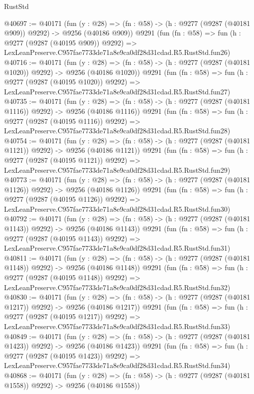 \begin{lexlean}{RustStd}
\begin{coremodule}
@40697 := @40171
    (fun (y : @28) => (fn : @58) -> (h : @9277 (@9287 (@40181 @909)) @9292) -> @9256 (@40186 @909))
    @9291
    (fun (fn : @58) =>
    fun (h : @9277 (@9287 (@40195 @909)) @9292) =>
    LexLeanPreserve.C957fae7733de71a8e9ca0df28d31cdad.R5.RustStd.fun26)
@40716 := @40171
    (fun (y : @28) =>
    (fn : @58) -> (h : @9277 (@9287 (@40181 @1020)) @9292) -> @9256 (@40186 @1020))
    @9291
    (fun (fn : @58) =>
    fun (h : @9277 (@9287 (@40195 @1020)) @9292) =>
    LexLeanPreserve.C957fae7733de71a8e9ca0df28d31cdad.R5.RustStd.fun27)
@40735 := @40171
    (fun (y : @28) =>
    (fn : @58) -> (h : @9277 (@9287 (@40181 @1116)) @9292) -> @9256 (@40186 @1116))
    @9291
    (fun (fn : @58) =>
    fun (h : @9277 (@9287 (@40195 @1116)) @9292) =>
    LexLeanPreserve.C957fae7733de71a8e9ca0df28d31cdad.R5.RustStd.fun28)
@40754 := @40171
    (fun (y : @28) =>
    (fn : @58) -> (h : @9277 (@9287 (@40181 @1121)) @9292) -> @9256 (@40186 @1121))
    @9291
    (fun (fn : @58) =>
    fun (h : @9277 (@9287 (@40195 @1121)) @9292) =>
    LexLeanPreserve.C957fae7733de71a8e9ca0df28d31cdad.R5.RustStd.fun29)
@40773 := @40171
    (fun (y : @28) =>
    (fn : @58) -> (h : @9277 (@9287 (@40181 @1126)) @9292) -> @9256 (@40186 @1126))
    @9291
    (fun (fn : @58) =>
    fun (h : @9277 (@9287 (@40195 @1126)) @9292) =>
    LexLeanPreserve.C957fae7733de71a8e9ca0df28d31cdad.R5.RustStd.fun30)
@40792 := @40171
    (fun (y : @28) =>
    (fn : @58) -> (h : @9277 (@9287 (@40181 @1143)) @9292) -> @9256 (@40186 @1143))
    @9291
    (fun (fn : @58) =>
    fun (h : @9277 (@9287 (@40195 @1143)) @9292) =>
    LexLeanPreserve.C957fae7733de71a8e9ca0df28d31cdad.R5.RustStd.fun31)
@40811 := @40171
    (fun (y : @28) =>
    (fn : @58) -> (h : @9277 (@9287 (@40181 @1148)) @9292) -> @9256 (@40186 @1148))
    @9291
    (fun (fn : @58) =>
    fun (h : @9277 (@9287 (@40195 @1148)) @9292) =>
    LexLeanPreserve.C957fae7733de71a8e9ca0df28d31cdad.R5.RustStd.fun32)
@40830 := @40171
    (fun (y : @28) =>
    (fn : @58) -> (h : @9277 (@9287 (@40181 @1217)) @9292) -> @9256 (@40186 @1217))
    @9291
    (fun (fn : @58) =>
    fun (h : @9277 (@9287 (@40195 @1217)) @9292) =>
    LexLeanPreserve.C957fae7733de71a8e9ca0df28d31cdad.R5.RustStd.fun33)
@40849 := @40171
    (fun (y : @28) =>
    (fn : @58) -> (h : @9277 (@9287 (@40181 @1423)) @9292) -> @9256 (@40186 @1423))
    @9291
    (fun (fn : @58) =>
    fun (h : @9277 (@9287 (@40195 @1423)) @9292) =>
    LexLeanPreserve.C957fae7733de71a8e9ca0df28d31cdad.R5.RustStd.fun34)
@40868 := @40171
    (fun (y : @28) =>
    (fn : @58) -> (h : @9277 (@9287 (@40181 @1558)) @9292) -> @9256 (@40186 @1558))

\end{coremodule}
\end{lexlean}
